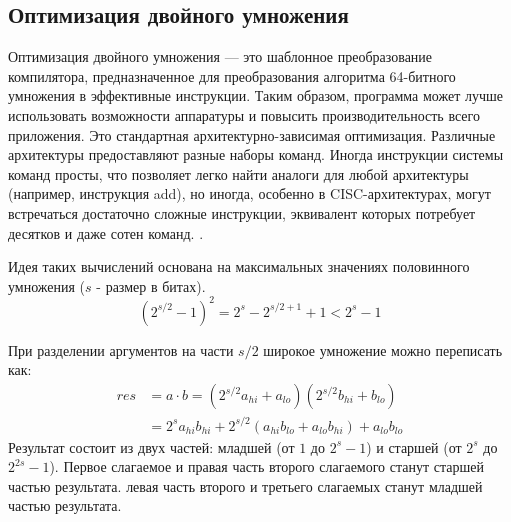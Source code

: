 \subsection{Оптимизация двойного умножения}
Оптимизация двойного умножения — это шаблонное преобразование компилятора, предназначенное для преобразования алгоритма 64-битного умножения в  эффективные инструкции. Таким образом, программа может лучше использовать возможности аппаратуры и повысить производительность всего приложения. Это стандартная архитектурно-зависимая оптимизация. Различные архитектуры предоставляют разные наборы команд. Иногда инструкции системы команд просты, что позволяет легко найти аналоги для любой архитектуры (например, инструкция add), но иногда, особенно в CISC-архитектурах, могут встречаться достаточно сложные инструкции, эквивалент которых потребует десятков и даже сотен команд.  \cite{bansal2021reduced, isen2009tale}.


Идея таких вычислений основана на максимальных значениях половинного умножения ($s$ - размер в битах).
\begin{equation*} \label{eq1}
	\left(2^{s/2}-1\right)^2=2^s-2^{s/2+1}+1<2^s-1
\end{equation*}

При разделении аргументов на части $s/2$ широкое умножение можно переписать как:
\begin{equation*} \label{eq2}
	\begin{split}
		res& =a\cdot b =\left(2^{s/2}a_{hi}+a_{lo}\right)\left(2^{s/2}b_{hi}+b_{lo}\right) \\
		& =2^sa_{hi}b_{hi}+2^{s/2}\left(a_{hi}b_{lo}+a_{lo}b_{hi}\right)+a_{lo}b_{lo}  
	\end{split}
\end{equation*}
Результат состоит из двух частей: младшей (от $1$ до $2^s - 1$) и старшей (от $2^s$ до $2^{2s} -1$). Первое слагаемое  и правая часть второго слагаемого станут старшей частью результата. левая часть второго и третьего слагаемых станут младшей частью результата.


